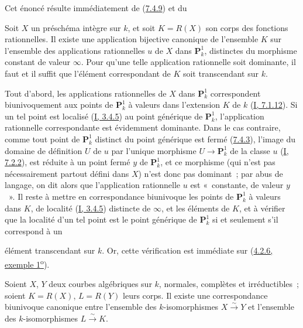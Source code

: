 Cet énoncé résulte immédiatement de (\hyperref[II.7.4.9-fr]{7.4.9}) et du

\begin{lemma}[7.4.15.1]
\label{II.7.4.15.1-fr}
Soit $X$ un préschéma intègre sur $k$, et soit $K=R(X)$ son corps des fonctions
rationnelles. Il existe une application bijective canonique de l'ensemble
$K$ sur l'ensemble des applications rationnelles $u$ de $X$ dans
$\mathbf{P}_k^1$, distinctes du morphisme constant de valeur $\infty$. Pour
qu'une telle application rationnelle soit dominante, il faut et il suffit que
l'élément correspondant de $K$ soit transcendant sur $k$.
\end{lemma}

Tout d'abord, les applications rationnelles de $X$ dans $\mathbf{P}_k^1$
correspondent biunivoquement aux points de $\mathbf{P}_k^1$ à valeurs dans
l'extension $K$ de $k$ (\hyperref[I.7.1.12-fr]{I, 7.1.12}). Si un tel point
est localisé (\hyperref[I.3.4.5-fr]{I, 3.4.5}) au point générique de
$\mathbf{P}_k^1$, l'application rationnelle correspondante est évidemment
dominante. Dans le cas contraire, comme tout point de $\mathbf{P}_k^1$
distinct du point générique est fermé (\hyperref[II.7.4.3-fr]{7.4.3}),
l'image du domaine de définition $U$ de $u$ par l'unique morphisme
$U\to\mathbf{P}_k^1$ de la classe $u$ (\hyperref[I.7.2.2-fr]{I, 7.2.2}),
est réduite à un point fermé $y$ de $\mathbf{P}_k^1$, et ce morphisme (qui
n'est pas nécessairement partout défini dans $X$) n'est donc pas dominant~;
par abus de langage, on dit alors que l'application rationnelle $u$ est
«~constante, de valeur $y$~». Il reste à mettre en correspondance biunivoque
les points de $\mathbf{P}_k^1$ à valeurs dans $K$, de localité
(\hyperref[I.3.4.5-fr]{I, 3.4.5}) distincte de $\infty$, et les éléments de
$K$, et à vérifier que la localité d'un tel point est le point générique de
$\mathbf{P}_k^1$ si et seulement s'il correspond à un

élément transcendant sur $k$. Or, cette vérification est immédiate sur
(\hyperref[II.4.2.6-fr]{4.2.6, exemple 1\textsuperscript{o}}).

\begin{corollary}[7.4.16]
\label{II.7.4.16-fr}
Soient $X$, $Y$ deux courbes algébriques sur $k$, normales, complètes et
irréductibles~; soient $K=R(X)$, $L=R(Y)$ leurs corps. Il existe une
correspondance biunivoque canonique entre l'ensemble des $k$-isomorphismes
$X\xrightarrow{\sim}Y$ et l'ensemble des $k$-isomorphismes
$L\xrightarrow{\sim}K$.
\end{corollary}

